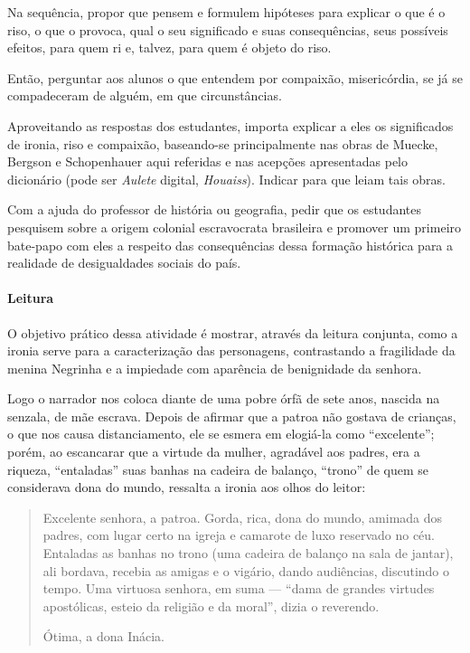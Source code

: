 \documentclass[11pt]{extarticle}
\begin{document}
Na sequência, propor que pensem e formulem hipóteses para explicar o que
é o riso, o que o provoca, qual o seu significado e suas consequências,
seus possíveis efeitos, para quem ri e, talvez, para quem é objeto do
riso.

Então, perguntar aos alunos o que entendem por compaixão, misericórdia,
se já se compadeceram de alguém, em que circunstâncias.

Aproveitando as respostas dos estudantes, importa explicar a eles os
significados de ironia, riso e compaixão, baseando-se principalmente nas
obras de Muecke, Bergson e Schopenhauer aqui referidas e nas acepções
apresentadas pelo dicionário (pode ser \emph{Aulete} digital,
\emph{Houaiss}). Indicar para que leiam tais obras.

Com a ajuda do professor de história ou geografia, 
pedir que os estudantes pesquisem sobre a origem colonial escravocrata
brasileira e promover um primeiro bate-papo com eles a respeito das
consequências dessa formação histórica para a realidade de desigualdades
sociais do país.

\asterisc\paragraph{Leitura}

O objetivo prático dessa atividade é mostrar, através 
da leitura conjunta, como a ironia serve para 
a caracterização das personagens,
contrastando a fragilidade da menina Negrinha e a impiedade com
aparência de benignidade da senhora.

Logo o narrador nos coloca diante de uma pobre órfã de sete anos,
nascida na senzala, de mãe escrava. Depois de afirmar que a patroa não
gostava de crianças, o que nos causa distanciamento, ele se esmera em
elogiá-la como ``excelente''; porém, ao escancarar que a virtude da
mulher, agradável aos padres, era a riqueza, ``entaladas'' suas banhas
na cadeira de balanço, ``trono'' de quem se considerava dona do mundo,
ressalta a ironia aos olhos do leitor:

\begin{quote}
Excelente senhora, a patroa. Gorda, rica, dona do mundo, amimada dos
padres, com lugar certo na igreja e camarote de luxo reservado no céu.
Entaladas as banhas no trono (uma cadeira de balanço na sala de jantar),
ali bordava, recebia as amigas e o vigário, dando audiências, discutindo
o tempo. Uma virtuosa senhora, em suma --- ``dama de grandes virtudes
apostólicas, esteio da religião e da moral'', dizia o reverendo.

Ótima, a dona Inácia.
\end{quote}
\end{document}
